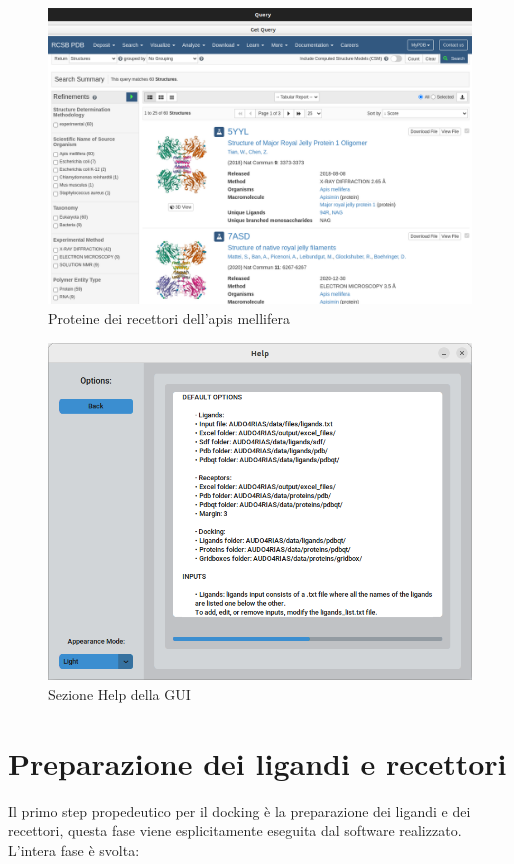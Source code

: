 \begin{figure}[H]
    \centering
    \includegraphics[scale=0.4]{immagini/capitolo3/fileRecettori.png}
    \caption{Proteine dei recettori dell'apis mellifera}
    \label{fig:file recettori}
\end{figure}

\begin{figure}[H]
    \centering
    \includegraphics[scale=0.6]{immagini/capitolo3/help.png}
    \caption{Sezione Help della GUI}
    \label{fig:help}
\end{figure}

\section{Preparazione dei ligandi e recettori}
Il primo step propedeutico per il docking è la preparazione dei ligandi e dei recettori, questa
fase viene esplicitamente eseguita dal software realizzato. L'intera fase è svolta:

